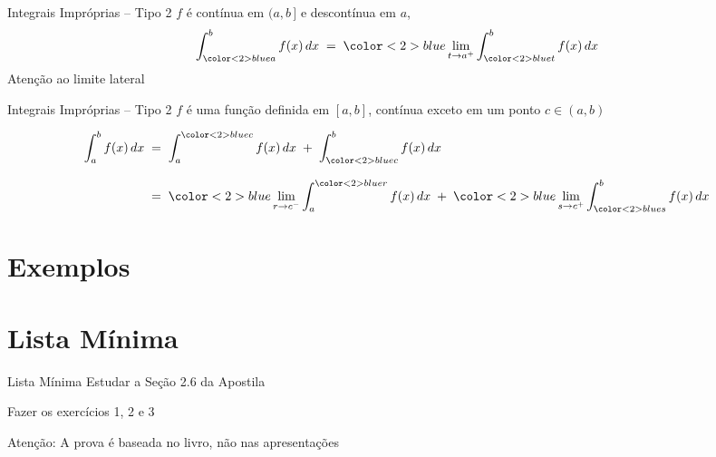 \documentclass[fleqn,utf8,aspectratio=169,12pt]{beamer}
\begin{document}
\begin{frame}{Integrais Impróprias -- Tipo 2}
  $f$ é contínua em {\color{blue} $(a, b\,]$} e descontínua em $a$,
  {
  \large
  \[
    \int_{{\color<2>{blue} a}}^b f(x)\,dx
    \;=\; {\color<2>{blue} \lim_{t\to a^+}}
    \int_{{\color<2>{blue} t}}^b f(x)\,dx
  \]}
  Atenção ao limite lateral
\end{frame}

\begin{frame}{Integrais Impróprias -- Tipo 2}
  $f$ é uma função definida em $[a, b]$, contínua exceto em um ponto
  {\color{blue} $c \in (a, b)$}
  {
  \large
  \begin{align*}
      \int_a^b f(x) \, dx
    & \;=\; \int^{{\color<2>{blue} c}}_a f(x) \, dx
      \;+\; \int_{{\color<2>{blue} c}}^b f(x) \, dx \\[3mm]
    & \;=\; {\color<2>{blue} \lim_{r\to c^-}} \int^{{\color<2>{blue} r}}_a f(x) \, dx
      \;+\; {\color<2>{blue} \lim_{s\to c^+}} \int_{{\color<2>{blue} s}}^b f(x) \, dx
  \end{align*}

  }
\end{frame}

\section{Exemplos}




\section{Lista Mínima}

\begin{frame}{Lista Mínima}
  Estudar a Seção 2.6 da Apostila

  Fazer os exercícios 1, 2 e 3

  \vfill
  Atenção: A prova é baseada no livro, não nas apresentações
\end{frame}

\end{document}
